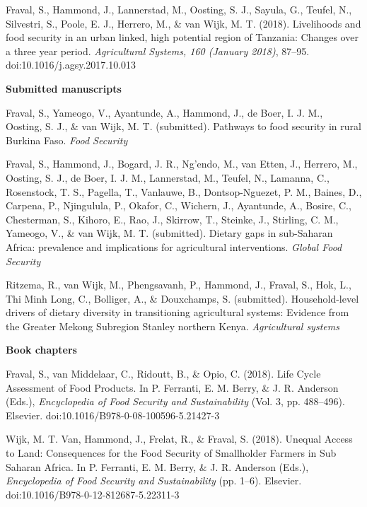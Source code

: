 Fraval, S., Hammond, J., Lannerstad, M., Oosting, S. J., Sayula, G., Teufel, N., Silvestri, S., Poole, E. J., Herrero, M., \& van Wijk, M. T. (2018). Livelihoods and food security in an urban linked, high potential region of Tanzania: Changes over a three year period. \textit{Agricultural Systems, 160 (January 2018)}, 87–95. doi:10.1016/j.agsy.2017.10.013

{\normalsize\textbf{Submitted manuscripts}}

Fraval, S., Yameogo, V., Ayantunde, A., Hammond, J., de Boer, I. J. M., Oosting, S. J., \& van Wijk, M. T. (submitted). Pathways to food security in rural Burkina Faso. \textit{Food Security}

Fraval, S., Hammond, J., Bogard, J. R., Ng'endo, M., van Etten, J., Herrero, M., Oosting, S. J., de Boer, I. J. M., Lannerstad, M., Teufel, N., Lamanna, C., Rosenstock, T. S., Pagella, T., Vanlauwe, B., Dontsop-Nguezet, P. M., Baines, D., Carpena, P., Njingulula, P., Okafor, C., Wichern, J., Ayantunde, A., Bosire, C., Chesterman, S., Kihoro, E., Rao, J., Skirrow, T., Steinke, J., Stirling, C. M., Yameogo, V., \& van Wijk, M. T. (submitted). Dietary gaps in sub-Saharan Africa: prevalence and implications for agricultural interventions. \textit{Global Food Security}

Ritzema, R., van Wijk, M., Phengsavanh, P., Hammond, J., Fraval, S., Hok, L., Thi Minh Long, C., Bolliger, A., \& Douxchamps, S. (submitted). Household-level drivers of dietary diversity in transitioning agricultural systems: Evidence from the Greater Mekong Subregion
Stanley northern Kenya. \textit{Agricultural systems}



{\normalsize\textbf{Book chapters}}

Fraval, S., van Middelaar, C., Ridoutt, B., \& Opio, C. (2018). Life Cycle Assessment of Food Products. In P. Ferranti, E. M. Berry, \& J. R. Anderson (Eds.), \textit{Encyclopedia of Food Security and Sustainability} (Vol. 3, pp. 488–496). Elsevier. doi:10.1016/B978-0-08-100596-5.21427-3

Wijk, M. T. Van, Hammond, J., Frelat, R., \& Fraval, S. (2018). Unequal Access to Land: Consequences for the Food Security of Smallholder Farmers in Sub Saharan Africa. In P. Ferranti, E. M. Berry, \& J. R. Anderson (Eds.), \textit{Encyclopedia of Food Security and Sustainability} (pp. 1–6). Elsevier. doi:10.1016/B978-0-12-812687-5.22311-3



